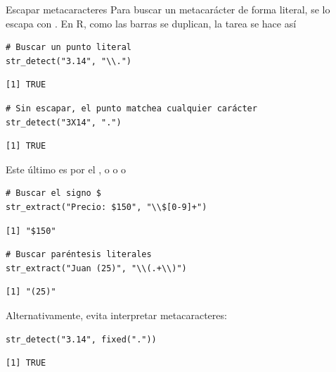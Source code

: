 \documentclass[8pt]{beamer}
\begin{document}
\begin{frame}[fragile]{Escapar metacaracteres}
	Para buscar un metacarácter de forma literal, se lo escapa con \rscript{\\\\}. En R, como las barras se duplican, la tarea se hace as\'i
\begin{lstlisting}[style=RScript]
# Buscar un punto literal
str_detect("3.14", "\\.")
\end{lstlisting}
\begin{lstlisting}[style=RConsole]
[1] TRUE
\end{lstlisting}
\begin{lstlisting}[style=RScript]
# Sin escapar, el punto matchea cualquier carácter
str_detect("3X14", ".")
\end{lstlisting}
\begin{lstlisting}[style=RConsole]
[1] TRUE
\end{lstlisting}
Este \'ultimo  es por el , o  o  o 

\begin{lstlisting}[style=RScript]
# Buscar el signo $
str_extract("Precio: $150", "\\$[0-9]+")
\end{lstlisting}
\begin{lstlisting}[style=RConsole]
[1] "$150"
\end{lstlisting}
\begin{lstlisting}[style=RScript]
# Buscar paréntesis literales
str_extract("Juan (25)", "\\(.+\\)")
\end{lstlisting}
\begin{lstlisting}[style=RConsole]
[1] "(25)"
\end{lstlisting}
\end{frame}




\begin{frame}[fragile]
Alternativamente,  evita interpretar metacaracteres:
\begin{lstlisting}[style=RScript]
str_detect("3.14", fixed("."))
\end{lstlisting}
\begin{lstlisting}[style=RConsole]
[1] TRUE
\end{lstlisting}
\end{frame}
\end{document}
